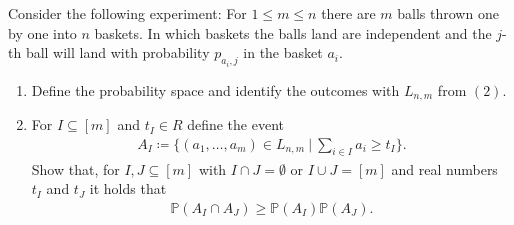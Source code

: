 \begin{problem}
  Consider the following experiment: For $1 \leq m \leq n$ there are $m$ balls thrown one by one into $n$ baskets. In which baskets the balls land are independent and the $j$-th ball will land with probability $p_{a_{i},j}$ in the basket $a_{i}$.
  \begin{enumerate}[label=(\roman*)]
    \item Define the probability space and identify the outcomes with $L_{n,m}$ from $(2)$.
    \item For $I \subseteq [m]$ and $t_{I} \in R$ define the event
      \begin{align*}
        A_{I} \coloneqq \{ (a_{1}, \ldots, a_{m}) \in L_{n,m} \ | \ \sum\limits_{i \in I} a_{i} \geq t_{I} \}.
      \end{align*}
      Show that, for $I,J \subseteq [m]$ with $I \cap J = \emptyset$ or $I \cup J = [m]$ and real numbers $t_{I}$ and $t_{J}$ it holds that
      \begin{align*}
        \mathbb{P}(A_{I} \cap A_{J}) \geq \mathbb{P}(A_{I}) \mathbb{P}(A_{J}).
      \end{align*}
  \end{enumerate}
\end{problem}
